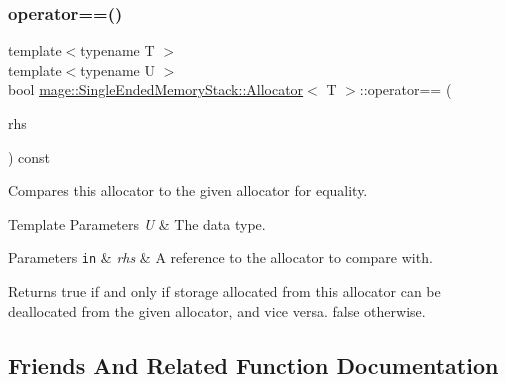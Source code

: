 \subsubsection{\texorpdfstring{operator==()}{operator==()}}
{\footnotesize\ttfamily template$<$typename T $>$ \\
template$<$typename U $>$ \\
bool \mbox{\hyperlink{classmage_1_1_single_ended_memory_stack_1_1_allocator}{mage\+::\+Single\+Ended\+Memory\+Stack\+::\+Allocator}}$<$ T $>$\+::operator== (\begin{DoxyParamCaption}\item[{const \mbox{\hyperlink{classmage_1_1_single_ended_memory_stack_1_1_allocator}{Allocator}}$<$ U $>$ \&}]{rhs }\end{DoxyParamCaption}) const\hspace{0.3cm}{\ttfamily [noexcept]}}

Compares this allocator to the given allocator for equality.


\begin{DoxyTemplParams}{Template Parameters}
{\em U} & The data type. \\
\hline
\end{DoxyTemplParams}

\begin{DoxyParams}[1]{Parameters}
\mbox{\tt in}  & {\em rhs} & A reference to the allocator to compare with. \\
\hline
\end{DoxyParams}
\begin{DoxyReturn}{Returns}
{\ttfamily true} if and only if storage allocated from this allocator can be deallocated from the given allocator, and vice versa. {\ttfamily false} otherwise. 
\end{DoxyReturn}


\subsection{Friends And Related Function Documentation}
\mbox{\label{classmage_1_1_single_ended_memory_stack_1_1_allocator_a3f3449e5c2caa1666a293b36db6f5a54}} 
